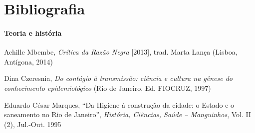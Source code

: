\documentclass[12pt]{extarticle}
\begin{document}

\section{Bibliografia}

\paragraph{Teoria e história}

Achille Mbembe, \emph{Crítica da Razão Negra} {[}2013{]}, trad. Marta
Lança (Lisboa, Antígona, 2014)

Dina Czeresnia, \emph{Do contágio à transmissão: ciência e cultura na
gênese do conhecimento epidemiológico} (Rio de Janeiro, Ed. FIOCRUZ,
1997)

Eduardo César Marques, ``Da Higiene à construção da cidade: o Estado e o
saneamento no Rio de Janeiro'', \emph{História, Ciências, Saúde --
Manguinhos}, Vol. II (2), Jul.-Out. 1995
\end{document}
